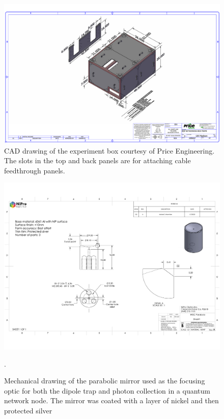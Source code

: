 \begin{figure}
    \centering
    \includegraphics[width=1\textwidth]{Images/AQX Networking Box Frame LAYOUT.pdf}
    \caption{CAD drawing of the experiment box courtesy of Price Engineering. The slots in the top and back panels are for attaching cable feedthrough panels.}
    \label{fig:experiment_box_frame}
\end{figure}


\newpage

\begin{figure}
    \centering
    \includegraphics[width=1\textwidth]{Images/nipro_parabolic_mirror_drawing.pdf}
    \caption{Mechanical drawing of the parabolic mirror used as the focusing optic for both the dipole trap and photon collection in a quantum network node. The mirror was coated with a layer of nickel and then protected silver}.
    \label{fig:mirror}
\end{figure}
